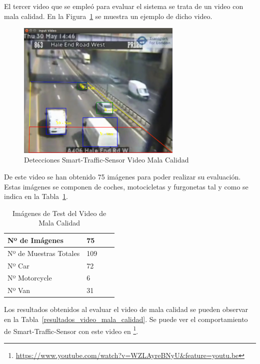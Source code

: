 El tercer video que se empleó para evaluar el sistema se trata de un video con mala calidad. En la Figura~\ref{fig.video_mala_calidad} se muestra un ejemplo de dicho video.


\begin{figure}[H] 
\begin{center}
	\includegraphics[width=0.7\textwidth]{figures/Experimentos/sts_mala_calidad.png}
   \caption{Detecciones Smart-Traffic-Sensor Video Mala Calidad}
	\label{fig.video_mala_calidad}
\end{center}
\end{figure}

De este video se han obtenido 75 imágenes para poder realizar su evaluación. Estas imágenes se componen de coches, motocicletas y furgonetas tal y como se indica en la Tabla~\ref{tabla_video_mala_calidad}. 

\begin{table}[htbp][H] 
\begin{center}
\begin{tabular}{|l|l|l|l|}
\hline
Nº de Imágenes  & 75 \\
\hline \hline
Nº de Muestras Totales & 109\\ \hline
Nº Car & 72 \\ \hline
Nº Motorcycle & 6 \\ \hline
Nº Van & 31 \\ \hline
\end{tabular}
\caption{Imágenes de Test del Video de Mala Calidad}
\label{tabla_video_mala_calidad}
\end{center}
\end{table}

Los resultados obtenidos al evaluar el video de mala calidad se pueden observar en la Tabla~\ref{resultados_video_mala_calidad}. Se puede ver el comportamiento de Smart-Traffic-Sensor con este video en \footnote{\url{https://www.youtube.com/watch?v=WZLAyreBNyU&feature=youtu.be}}.

